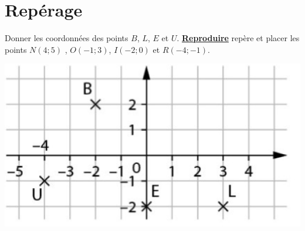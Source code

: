 \section{Repérage}

\begin{questions}
	\question Donner les coordonnées des points $B$, $L$, $E$ et $U$.
	\question \textbf{\underline{Reproduire}} repère et placer les points $N(4;5)$ , $O(-1;3)$, $I(-2;0)$ et $R(-4;-1)$.
	
	\begin{center}
		\includegraphics[scale=0.25]{img/repere}	
	\end{center}
	
\end{questions}